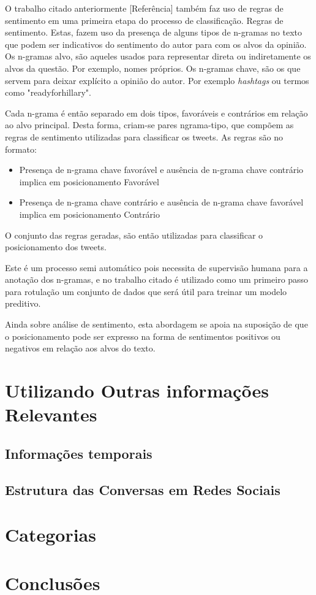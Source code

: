 \quad O trabalho citado anteriormente [Referência] também faz uso de regras de
sentimento em uma primeira etapa do processo de classificação. Regras de
sentimento. Estas, fazem uso da presença de alguns tipos de n-gramas no texto que
podem ser indicativos do sentimento do autor para com os alvos da opinião.
Os n-gramas alvo, são aqueles usados para representar direta ou indiretamente os
alvos da questão. Por exemplo, nomes próprios. Os n-gramas chave, são os que servem
para deixar explícito a opinião do autor. Por exemplo \textit{hashtags} ou termos
como "readyforhillary". 

\quad Cada n-grama é então separado em dois tipos, favoráveis e contrários em relação
ao alvo principal. Desta forma, criam-se pares ngrama-tipo, que compõem as regras de
sentimento utilizadas para classificar os tweets. As regras são no formato:

\begin{itemize}
    \item Presença de n-grama chave favorável e ausência de n-grama chave contrário
    implica em posicionamento Favorável
    \item Presença de n-grama chave contrário e ausência de n-grama chave favorável
    implica em posicionamento Contrário 
\end{itemize}

\quad O conjunto das regras geradas, são então utilizadas para classificar o
posicionamento dos tweets.

\quad Este é um processo semi automático pois necessita de supervisão humana para a
anotação dos n-gramas, e no trabalho citado é utilizado como um primeiro passo para
rotulação um conjunto de dados que será útil para treinar um modelo preditivo.

\quad Ainda sobre análise de sentimento, esta abordagem se apoia na suposição de
que o posicionamento pode ser expresso na forma de sentimentos positivos ou
negativos em relação aos alvos do texto.

\section{Utilizando Outras informações Relevantes}

\subsection{Informações temporais}

\subsection{Estrutura das Conversas em Redes Sociais}

\section{Categorias}

\section{Conclusões}
